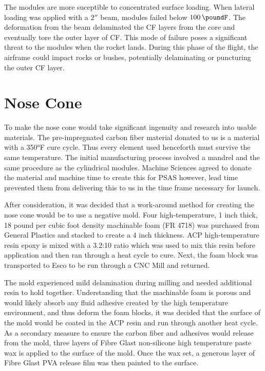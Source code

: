 \documentclass{aiaa-tc}%
\begin{document}
The modules are more suceptible to concentrated surface loading. 
When lateral loading was applied with a $2''$ beam, modules failed below $\SI{100}{\poundF}$. 
The deformation from the beam delaminated the CF layers from the core and eventually tore the outer layer of CF. 
This mode of failure poses a significant threat to the modules when the rocket lands. 
During this phase of the flight, the airframe could impact rocks or bushes, potentially delaminating or puncturing the outer CF layer. 

\section{Nose Cone}\label{sec:noseCone}

To make the nose cone would take significant ingenuity and research into usable materials. The pre-impregnated carbon fiber material donated to us is a material with a 350°F cure cycle. Thus every element used henceforth must survive the same temperature. The initial manufacturing process involved a mandrel and the same procedure as the cylindrical modules. Machine Sciences agreed to donate the material and machine time to create this for PSAS however, lead time prevented them from delivering this to us in the time frame necessary for launch. 

After consideration, it was decided that a work-around method for creating the nose cone would be to use a negative mold. Four high-temperature, 1 inch thick, 18 pound per cubic foot density machinable foam (FR 4718) was purchased from General Plastics and stacked to create a 4 inch thickness. ACP high-temperature resin epoxy is mixed with a 3.2:10 ratio which was used to mix this resin before application and then ran through a heat cycle to cure. Next, the foam block was transported to Esco to be run through a CNC Mill and returned. 

The mold experienced mild delamination during milling and needed additional resin to hold together. Understanding that the machinable foam is porous and would likely absorb any fluid adhesive created by the high temperature environment, and thus deform the foam blocks, it was decided that the surface of the mold would be coated in the ACP resin and run through another heat cycle. As a secondary measure to ensure the carbon fiber and adhesives would release from the mold, three layers of Fibre Glast non-silicone high temperature paste wax is applied to the surface of the mold. Once the wax set, a generous layer of Fibre Glast PVA release film was then painted to the surface. 
\end{document}
